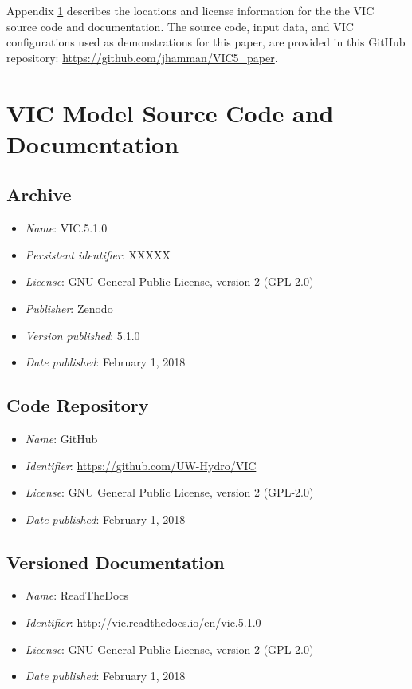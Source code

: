 \documentclass[gmd, manuscript]{copernicus}
\begin{document}
  Appendix \ref{appendix:source_code} describes the locations and license information for the the VIC source code and documentation. The source code, input data, and VIC configurations used as demonstrations for this paper, are provided in this GitHub repository: \url{https://github.com/jhamman/VIC5_paper}.

\appendix
\section{VIC Model Source Code and Documentation}
\label{appendix:source_code}

\subsection{Archive}

\begin{itemize}
	\item \textit{Name}: VIC.5.1.0
	\item \textit{Persistent identifier}: XXXXX
	\item \textit{License}: GNU General Public License, version 2 (GPL-2.0)
	\item \textit{Publisher}: Zenodo
	\item \textit{Version published}: 5.1.0
	\item \textit{Date published}: February 1, 2018
\end{itemize}

\subsection{Code Repository}

\begin{itemize}
	\item \textit{Name}: GitHub
	\item \textit{Identifier}: \url{https://github.com/UW-Hydro/VIC}
	\item \textit{License}: GNU General Public License, version 2 (GPL-2.0)
	\item \textit{Date published}: February 1, 2018
\end{itemize}

\subsection{Versioned Documentation}

\begin{itemize}
	\item \textit{Name}: ReadTheDocs
	\item \textit{Identifier}: \url{http://vic.readthedocs.io/en/vic.5.1.0}
	\item \textit{License}: GNU General Public License, version 2 (GPL-2.0)
	\item \textit{Date published}: February 1, 2018
\end{itemize}
\end{document}
